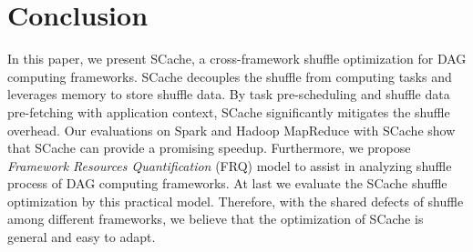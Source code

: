 \section{Conclusion}
In this paper, we present SCache, a cross-framework shuffle optimization for DAG computing frameworks. 
SCache decouples the shuffle from computing tasks and leverages memory to store shuffle data. 
By task pre-scheduling and shuffle data pre-fetching with application context, SCache significantly mitigates the shuffle overhead. 
{\color{black}
Our evaluations on Spark and Hadoop MapReduce with SCache show that SCache can provide a promising speedup. 
Furthermore, we propose \textit{Framework Resources Quantification} (FRQ) model to assist in analyzing shuffle process of DAG computing frameworks. At last we evaluate the SCache shuffle optimization by this practical model.
Therefore, with the shared defects of shuffle among different frameworks, we believe that the optimization of SCache is general and easy to adapt. 
}
